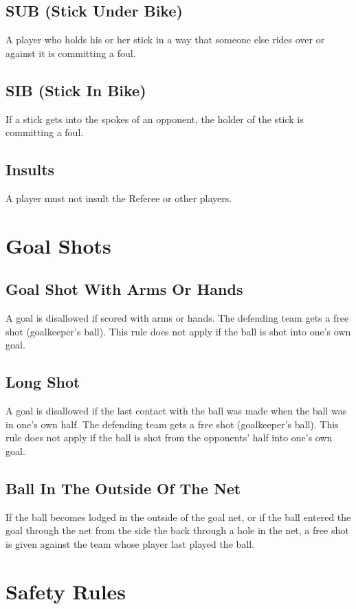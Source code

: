 \subsection{SUB (Stick Under Bike)}
A player who holds his or her stick in a way that someone else rides over or against it is committing a foul.

\subsection{SIB (Stick In Bike)}
If a stick gets into the spokes of an opponent, the holder of the stick is committing a foul.

\subsection{Insults}
A player must not insult the Referee or other players.

\section{Goal Shots}

\subsection{Goal Shot With Arms Or Hands \label{subsec:hockey_goal-shots_with-arms-or-hands}}
A goal is disallowed if scored with arms or hands.
The defending team gets a free shot (goalkeeper's ball).
This rule does not apply if the ball is shot into one's own goal.

\subsection{Long Shot}
A goal is disallowed if the last contact with the ball was made when the ball was in one's own half.
The defending team gets a free shot (goalkeeper's ball).
This rule does not apply if the ball is shot from the opponents' half into one's
own goal.

\subsection{Ball In The Outside Of The Net}
If the ball becomes lodged in the outside of the goal net, or if the ball entered the goal through the net from the side the back through a hole in the net, a free shot is given against the team whose player last played the ball.

\section{Safety Rules}

